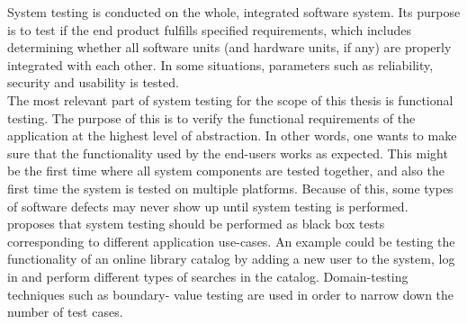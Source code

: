 System testing is conducted on the whole, integrated software system.
Its purpose is to test if the end product fulfills specified
requirements, which includes determining whether all software units (and
hardware units, if any) are properly integrated with each other. In some
situations, parameters such as reliability, security and usability is
tested.\cite{book:adp}\\

The most relevant part of system testing for the scope of this thesis is
functional testing. The purpose of this is to verify the functional
requirements of the application at the highest level of abstraction. In
other words, one wants to make sure that the functionality used by the
end-users works as expected. This might be the first time where all
system components are tested together, and also the first time the
system is tested on multiple platforms. Because of this, some types of
software defects may never show up until system testing is
performed.\cite{book:adp}\\

\citeauthor{book:adp} proposes that system testing should be performed
as black box tests corresponding to different application use-cases. An
example could be testing the functionality of an online library catalog
by adding a new user to the system, log in and perform different types
of searches in the catalog. Domain-testing techniques such as boundary-
value testing are used in order to narrow down the number of test
cases.\\
